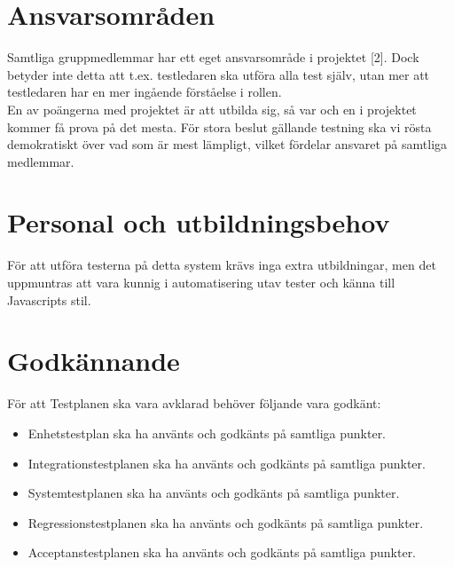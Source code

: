 \documentclass[10pt]{article}
\begin{document}
\section{Ansvarsområden}
	Samtliga gruppmedlemmar har ett eget ansvarsområde i projektet {\color{red}[2]}. Dock betyder inte detta att t.ex. testledaren ska utföra alla test själv, utan mer att testledaren har en mer ingående förståelse i rollen. \\
	En av poängerna med projektet är att utbilda sig, så var och en i projektet kommer få prova på det mesta. För stora beslut gällande testning ska vi rösta demokratiskt över vad som är mest lämpligt, vilket fördelar ansvaret på samtliga medlemmar.
	

\section{Personal och utbildningsbehov}
	För att utföra testerna på detta system krävs inga extra utbildningar, men det uppmuntras att vara kunnig i automatisering utav tester och känna till Javascripts stil.

	
	
\section{Godkännande}
	För att Testplanen ska vara avklarad behöver följande vara godkänt:
	\begin{itemize}
	 \item Enhetstestplan ska ha använts och godkänts på samtliga punkter.
	 \item Integrationstestplanen ska ha använts och godkänts på samtliga punkter.
	 \item Systemtestplanen ska ha använts och godkänts på samtliga punkter.
	 \item Regressionstestplanen ska ha använts och godkänts på samtliga punkter.
	 \item Acceptanstestplanen ska ha använts och godkänts på samtliga punkter.
	\end{itemize}
	
\end{document}
